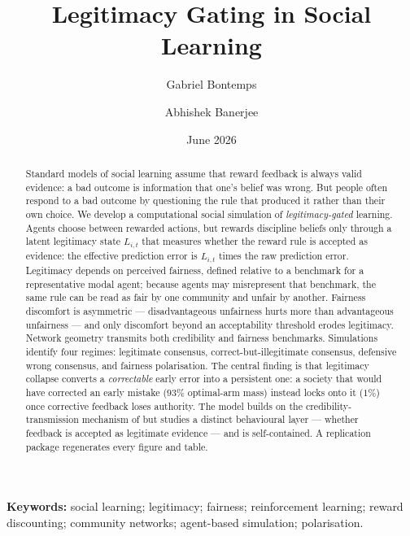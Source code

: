 \documentclass[11pt]{article}
\title{\bfseries Legitimacy Gating in Social Learning}
\author{Gabriel Bontemps \and Abhishek Banerjee}
\date{June 2026}
\newcommand{\1}{\mathbf{1}}
\begin{document}
\maketitle

\begin{abstract}
\noindent
Standard models of social learning assume that reward feedback is always valid
evidence: a bad outcome is information that one's belief was wrong. But people
often respond to a bad outcome by questioning the rule that produced it rather
than their own choice. We develop a computational social simulation of
\emph{legitimacy-gated} learning. Agents choose between rewarded actions, but
rewards discipline beliefs only through a latent legitimacy state $L_{i,t}$ that
measures whether the reward rule is accepted as evidence: the effective
prediction error is $L_{i,t}$ times the raw prediction error. Legitimacy depends
on perceived fairness, defined relative to a benchmark for a representative modal
agent; because agents may misrepresent that benchmark, the same rule can be read
as fair by one community and unfair by another. Fairness discomfort is
asymmetric --- disadvantageous unfairness hurts more than advantageous
unfairness --- and only discomfort beyond an acceptability threshold erodes
legitimacy. Network geometry transmits both credibility and fairness benchmarks.
Simulations identify four regimes: legitimate consensus, correct-but-illegitimate
consensus, defensive wrong consensus, and fairness polarisation. The central
finding is that legitimacy collapse converts a \emph{correctable} early error
into a persistent one: a society that would have corrected an early mistake
($93\%$ optimal-arm mass) instead locks onto it ($1\%$) once corrective feedback
loses authority. The model builds on the credibility-transmission mechanism of
\citet{BontempsBanerjee2026} but studies a distinct behavioural layer ---
whether feedback is accepted as legitimate evidence --- and is self-contained.
A replication package regenerates every figure and table.
\end{abstract}

\noindent\textbf{Keywords:} social learning; legitimacy; fairness; reinforcement
learning; reward discounting; community networks; agent-based simulation;
polarisation.
\end{document}
